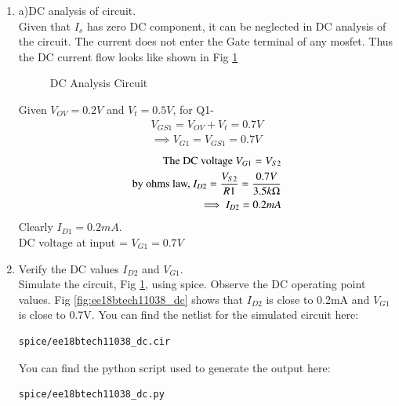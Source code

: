 \begin{enumerate}[label=\arabic*.,ref=\theenumi]
\renewcommand{\thefigure}{\theenumi.\arabic{figure}}
\item a)DC analysis of circuit.\\
\solution Given that $I_{s}$ has zero DC component, it can be neglected in DC analysis of the circuit. The current does not enter the Gate terminal of any mosfet. Thus the DC current flow looks like shown in Fig \ref{fig:ee18btech11038_dcckt} 

\begin{figure}[!ht]
	\begin{center}
		
		\resizebox{\columnwidth}{!}{}
	\end{center}
\caption{DC Analysis Circuit}
\label{fig:ee18btech11038_dcckt}
\end{figure}

Given $V_{OV} = 0.2V$ and  $V_{t} = 0.5V$, for Q1-
\begin{align}
    V_{GS1} = V_{OV}  + V_{t} = 0.7V\\
    \implies V_{G1} = V_{GS1} = 0.7V
    \end{align}
\begin{align}
    \text{The DC voltage } V_{G1} = V_{S2}\\
    \text{by ohms law, } I_{D2} = \frac{V_{S2}}{R{1}} = \frac{0.7V}{3.5k\ohm}\\
    \implies I_{D2} = 0.2mA
\end{align}
Clearly $I_{D1} = 0.2mA$.
\\
DC voltage at input = $V_{G1} = 0.7V$

\item Verify the DC values $I_{D2}$ and $V_{G1}$.\\
\solution Simulate the circuit, Fig \ref{fig:ee18btech11038_dcckt}, using spice. Observe the DC operating point values. Fig \ref{fig:ee18btech11038_dc} shows that $I_{D2}$ is close to 0.2mA and $V_{G1}$ is close to 0.7V.
You can find the netlist for the simulated circuit here:
\begin{lstlisting}
spice/ee18btech11038_dc.cir
\end{lstlisting}
You can find the python script used to generate the output here:
\begin{lstlisting}
spice/ee18btech11038_dc.py
\end{lstlisting}


\end{enumerate}
